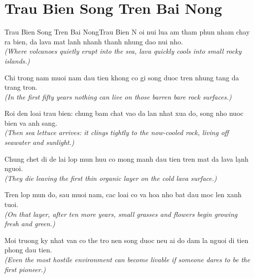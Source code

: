 \section{Trau Bien Song Tren Bai Nong}
\begin{truyen}{Trau Bien Song Tren Bai Nong}{Trau Bien}
N oi nui lua am tham phun nham chay ra bien, da lava mat lanh nhanh thanh nhung dao nui nho.\\
\textit{(Where volcanoes quietly erupt into the sea, lava quickly cools into small rocky islands.)}

Chi trong nam muoi nam dau tien khong co gi song duoc tren nhung tang da trang tron.\\
\textit{(In the first fifty years nothing can live on those barren bare rock surfaces.)}

Roi den loai trau bien: chung bam chat vao da lan nhat xua do, song nho nuoc bien va anh sang.\\
\textit{(Then sea lettuce arrives: it clings tightly to the now-cooled rock, living off seawater and sunlight.)}

Chung chet di de lai lop mun huu co mong manh dau tien tren mat da lava lạnh nguoi.\\
\textit{(They die leaving the first thin organic layer on the cold lava surface.)}

Tren lop mun do, sau muoi nam, cac loai co va hoa nho bat dau moc len xanh tuoi.\\
\textit{(On that layer, after ten more years, small grasses and flowers begin growing fresh and green.)}

\end{truyen}
\begin{baihoc}
  Moi truong ky nhat van co the tro nen song duoc neu ai do dam la nguoi di tien phong dau tien.\\
  \textit{(Even the most hostile environment can become livable if someone dares to be the first pioneer.)}
\end{baihoc}

